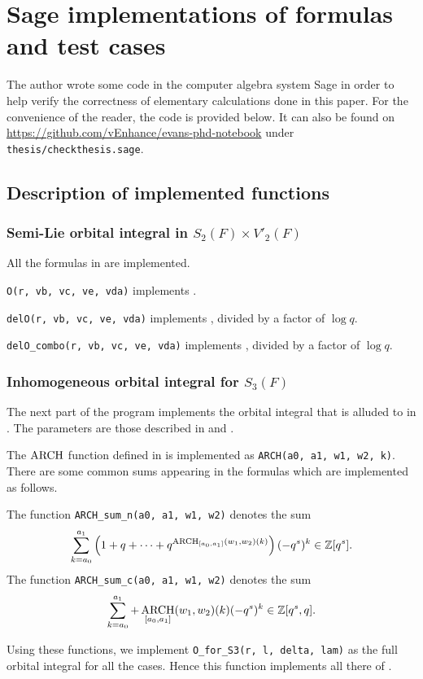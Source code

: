 \chapter{Sage implementations of formulas and test cases}
The author wrote some code in the computer algebra system Sage
in order to help verify the correctness of elementary calculations done in this paper.
For the convenience of the reader, the code is provided below.
It can also be found on \url{https://github.com/vEnhance/evans-phd-notebook}
under \texttt{thesis/checkthesis.sage}.

\section{Description of implemented functions}
\subsection{Semi-Lie orbital integral in $S_2(F) \times V'_2(F)$}
All the formulas in  are implemented.
\begin{itemize}
  \ii \texttt{O(r, vb, vc, ve, vda)}
  implements .

  \ii \texttt{delO(r, vb, vc, ve, vda)}
  implements ,
  divided by a factor of $\log q$.

  \ii \texttt{delO\_combo(r, vb, vc, ve, vda)}
  implements ,
  divided by a factor of $\log q$.
\end{itemize}

\subsection{Inhomogeneous orbital integral for $S_3(F)$}
The next part of the program implements the orbital integral
that is alluded to in .
The parameters are those described in  and .
\begin{itemize}
  \ii The $\operatorname*{ARCH}$ function defined in  is implemented
  as \texttt{ARCH(a0, a1, w1, w2, k)}.
  \ii There are some common sums appearing in the formulas
  which are implemented as follows.
  \begin{itemize}
    \ii The function \texttt{ARCH\_sum\_n(a0, a1, w1, w2)} denotes the sum
    \[ \sum_{k=a_0}^{a_1} \left( 1 + q + \dots
      + q^{\operatorname*{ARCH}_{[a_0, a_1]}(w_1, w_2)(k)} \right) (-q^s)^k \in \mathbb Z[q^s]. \]
    \ii The function \texttt{ARCH\_sum\_c(a0, a1, w1, w2)} denotes the sum
    \[ \sum_{k=a_0}^{a_1} + \operatorname*{ARCH}_{[a_0, a_1]}(w_1, w_2)(k) (-q^s)^k \in \mathbb Z[q^s, q]. \]
  \end{itemize}
  \ii Using these functions, we implement \texttt{O\_for\_S3(r, l, delta, lam)}
  as the full orbital integral for all the cases.
  Hence this function implements all there of
  .
\end{itemize}

